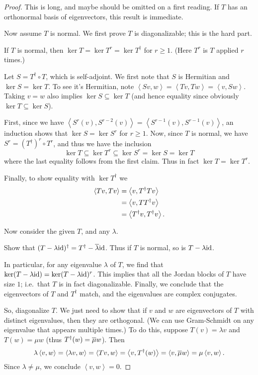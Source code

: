 \begin{proof}
	This is long, and maybe should be omitted on a first reading.
	If $T$ has an orthonormal basis of eigenvectors,
	this result is immediate.

	Now assume $T$ is normal.
	We first prove $T$ is diagonalizable; this is the hard part.
	\begin{claim}
		If $T$ is normal, then $\ker T = \ker T^r = \ker T^\dagger$ for $r \ge 1$.
		(Here $T^r$ is $T$ applied $r$ times.)
	\end{claim}
	\begin{subproof}
		Let $S = T^\dagger \circ T$, which is self-adjoint.
		We first note that $S$ is Hermitian and $\ker S = \ker T$.
		To see it's Hermitian, note
		$\left<Sv, w \right> = \left<Tv, Tw \right> = \left<v, S w \right>$.
		Taking $v = w$ also implies $\ker S \subseteq \ker T$
		(and hence equality since obviously $\ker T \subseteq \ker S$).

		First, since we have $\left< S^r(v), S^{r-2}(v) \right>
		= \left< S^{r-1}(v), S^{r-1}(v)\right>$,
		an induction shows that $\ker S = \ker S^r$ for $r \ge 1$.
		Now, since $T$ is normal, we have $S^r = (T^\dagger)^r \circ T^r$,
		and thus we have the inclusion
		\[ \ker T \subseteq \ker T^r \subseteq \ker S^r = \ker S = \ker T \]
		where the last equality follows from the first claim.
		Thus in fact $\ker T = \ker T^r$.

		Finally, to show equality with $\ker T^\dagger$ we
		\begin{align*}
			\left< Tv, Tv\right> &= \left< v, T^\dagger T v\right> \\
			&= \left< v, T T^\dagger v \right> \\
			&= \left< T^\dagger v, T^\dagger v \right>. \qedhere
		\end{align*}
	\end{subproof}

	Now consider the given $T$, and any $\lambda$.
	\begin{ques}
		Show that $(T - \lambda\mathrm{id})^\dagger = T^\dagger - \overline\lambda \mathrm{id}$.
		Thus if $T$ is normal, so is $T - \lambda \mathrm{id}$.
	\end{ques}
	In particular, for any eigenvalue $\lambda$ of $T$,
	we find that $\ker (T-\lambda\mathrm{id}) = \ker(T-\lambda\mathrm{id})^r$.
	This implies that all the Jordan blocks of $T$ have size $1$;
	i.e.\ that $T$ is in fact diagonalizable.
	Finally, we conclude that the eigenvectors of $T$ and $T^\dagger$ match,
	and the eigenvalues are complex conjugates.

	So, diagonalize $T$.
	We just need to show that if $v$ and $w$ are eigenvectors of $T$
	with distinct eigenvalues, then they are orthogonal.
	(We can use Gram-Schmidt on any eigenvalue that appears multiple times.)
	To do this, suppose $T(v) = \lambda v$ and $T(w) = \mu w$
	(thus $T^\dagger(w) = \overline\mu w $).
	Then
	\[ \lambda \left< v,w\right>
		= \left< \lambda v, w\right>
		= \left< Tv, w\right>
		= \left< v, T^\dagger(w)\right>
		= \left< v, \overline \mu w \right>
		= \mu \left< v, w\right>. \]
	Since $\lambda \neq \mu$, we conclude $\left< v,w \right> = 0$.
\end{proof}
